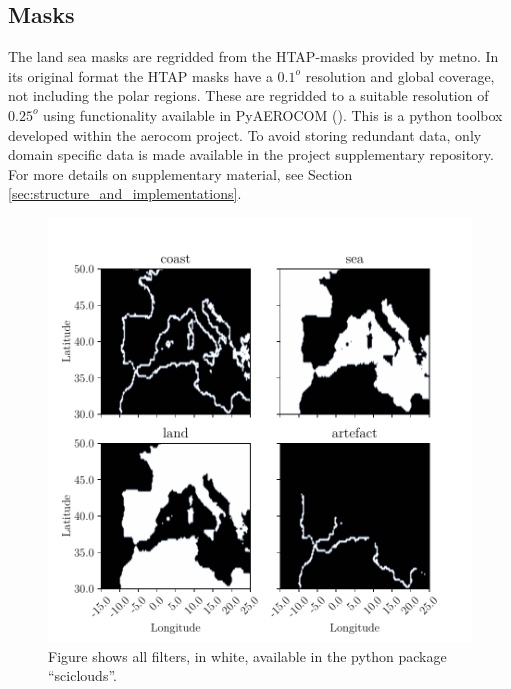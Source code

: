 \subsection{Masks} \label{sec:mask}
The land sea masks are regridded from the HTAP-masks provided by \acrfull{metno}. In its original format the HTAP masks have a $0.1^o$ resolution and global coverage, not including the polar regions. These are regridded to a suitable resolution of $0.25^o$ using functionality available in PyAEROCOM (\cite{pyaerocom}). %
This is a python toolbox developed within the \acrfull{aerocom} project. To avoid storing redundant data, only domain specific data is made available in the project supplementary repository. For more details on supplementary material, see Section \ref{sec:structure_and_implementations}.
\begin{figure}
    \centering
    \includegraphics{python_figs/filters.pdf}
    \caption{Figure shows all filters, in white, available in the python package ``sciclouds''.}
    \label{fig:filters_subplot}
\end{figure}

